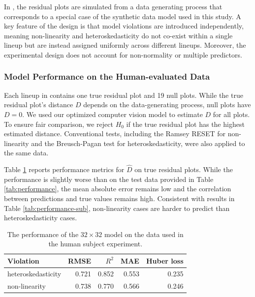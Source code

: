 \documentclass[]{interact}
\theoremstyle{plain}%
\theoremstyle{definition}
\theoremstyle{remark}
\begin{document}
In \citet{li2024plot}, the residual plots are simulated from a data
generating process that corresponds to a special case of the synthetic
data model used in this study. A key feature of the design is that model
violations are introduced independently, meaning non-linearity and
heteroskedasticity do not co-exist within a single lineup but are
instead assigned uniformly across different lineups. Moreover, the
experimental design does not account for non-normality or multiple
predictors.

\subsubsection{Model Performance on the Human-evaluated
Data}\label{model-performance-on-the-human-evaluated-data}

Each lineup in \citet{li2024plot} contains one true residual plot and 19
null plots. While the true residual plot's distance \(D\) depends on the
data-generating process, null plots have \(D = 0\). We used our
optimized computer vision model to estimate \(D\) for all plots. To
ensure fair comparison, we reject \(H_0\) if the true residual plot has
the highest estimated distance. Conventional tests, including the Ramsey
RESET \citep{ramsey1969tests} for non-linearity and the Breusch-Pagan
test \citep{breusch1979simple} for heteroskedasticity, were also applied
to the same data.

Table \ref{tab:experiment-performance} reports performance metrics for
\(\hat{D}\) on true residual plots. While the performance is slightly
worse than on the test data provided in Table \ref{tab:performance}, the
mean absolute error remains low and the correlation between predictions
and true values remains high. Consistent with results in Table
\ref{tab:performance-sub}, non-linearity cases are harder to predict
than heteroskedasticity cases.

\begin{table}

\caption{\label{tab:experiment-performance}The performance of the $32 \times 32$ model on the data used in the human subject experiment.}
\centering
\begin{tabular}[t]{lrrrr}
\toprule
Violation & RMSE & $R^2$ & MAE & Huber loss\\
\midrule
heteroskedasticity & 0.721 & 0.852 & 0.553 & 0.235\\
non-linearity & 0.738 & 0.770 & 0.566 & 0.246\\
\bottomrule
\end{tabular}
\end{table}
\end{document}
